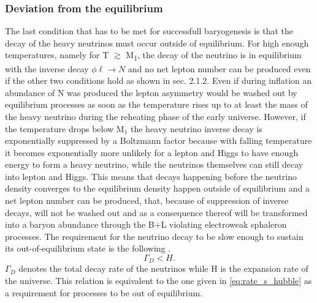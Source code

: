 \subsubsection{Deviation from the equilibrium}
The last condition that has to be met for successfull baryogenesis is that the decay of the heavy neutrinos must occur outside of equilibrium. For high enough temperatures, namely for T $\gtrsim$ M\textsubscript{1}, the decay of the neutrino is in equilibrium with the inverse decay $\phi\ell\rightarrow N$ and no net lepton number can be produced even if the other two conditions hold as shown in sec. 2.1.2. Even if during inflation an abundance of N was produced the lepton asymmetry would be washed out by equilibrium processes as soon as the temperature rises up to at least the mass of the heavy neutrino during the reheating phase of the early universe. \newline\indent
However, if the temperature drops below M$_1$ the heavy neutrino inverse decay is exponentially suppressed by a Boltzmann factor because with falling temperature it becomes exponentially more unlikely for a lepton and Higgs to have enough energy to form a heavy neutrino, while the neutrinos themselves can still decay into lepton and Higgs. This means that decays happening before the neutrino density converges to the equilibrium density happen outside of equilibrium and a net lepton number can be produced, that, because of suppression of inverse decays, will not be washed out and as a consequence thereof will be transformed into a baryon abundance through the B+L violating electroweak sphaleron processes.\newline\indent
The requirement for the neutrino decay to be slow enough to sustain its out-of-equilibrium state is the following \cite[p. 30]{Taanila:2008}.
\begin{equation}
	\Gamma_D<H.
	\label{eq:out_of_eq}
\end{equation}
$\Gamma_D$ denotes the total decay rate of the neutrinos while H is the expansion rate of the universe. This relation is equivalent to the one given in \eqref{eq:rate_s_hubble} as a requirement for processes to be out of equilibrium. 